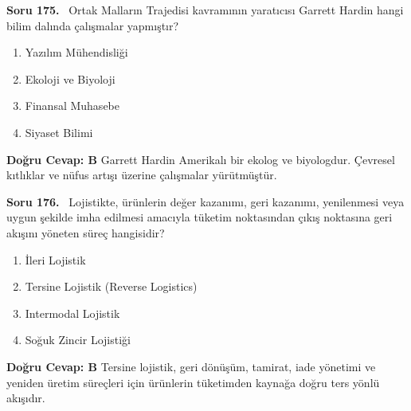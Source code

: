 \documentclass[11pt,a4paper,openany]{book}
\begin{document}
\needspace{5cm}
\vspace{8pt}
\noindent\textbf{\large\sffamily Soru 175.} \ Ortak Malların Trajedisi kavramının yaratıcısı Garrett Hardin hangi bilim dalında çalışmalar yapmıştır?
\begin{enumerate}[label=\Alph*), leftmargin=25pt, topsep=4pt, itemsep=2pt]
    \item Yazılım Mühendisliği
    \item Ekoloji ve Biyoloji
    \item Finansal Muhasebe
    \item Siyaset Bilimi
\end{enumerate}
\vspace{4pt}
\begin{tcolorbox}[title=Cevap ve Açıklama, colback=gray!3!white, colframe=primarycolor!90!black, arc=2mm, fonttitle=\bfseries\sffamily, top=6pt, bottom=6pt]
    \textbf{Doğru Cevap: B}
    \vspace{2pt}
    Garrett Hardin Amerikalı bir ekolog ve biyologdur. Çevresel kıtlıklar ve nüfus artışı üzerine çalışmalar yürütmüştür.
\end{tcolorbox}
\vspace{10pt}

\needspace{5cm}
\vspace{8pt}
\noindent\textbf{\large\sffamily Soru 176.} \ Lojistikte, ürünlerin değer kazanımı, geri kazanımı, yenilenmesi veya uygun şekilde imha edilmesi amacıyla tüketim noktasından çıkış noktasına geri akışını yöneten süreç hangisidir?
\begin{enumerate}[label=\Alph*), leftmargin=25pt, topsep=4pt, itemsep=2pt]
    \item İleri Lojistik
    \item Tersine Lojistik (Reverse Logistics)
    \item Intermodal Lojistik
    \item Soğuk Zincir Lojistiği
\end{enumerate}
\vspace{4pt}
\begin{tcolorbox}[title=Cevap ve Açıklama, colback=gray!3!white, colframe=primarycolor!90!black, arc=2mm, fonttitle=\bfseries\sffamily, top=6pt, bottom=6pt]
    \textbf{Doğru Cevap: B}
    \vspace{2pt}
    Tersine lojistik, geri dönüşüm, tamirat, iade yönetimi ve yeniden üretim süreçleri için ürünlerin tüketimden kaynağa doğru ters yönlü akışıdır.
\end{tcolorbox}
\vspace{10pt}
\end{document}
